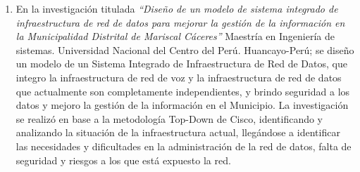 \documentclass[10pt,conference]{IEEEtran}
\begin{document}
\begin{enumerate}
\item En la investigación titulada \textit{“Diseño de un modelo de sistema integrado de infraestructura de red de datos para mejorar la gestión de la información en la Municipalidad Distrital de Mariscal Cáceres”} Maestría en Ingeniería de sistemas. Universidad Nacional del Centro del Perú. Huancayo-Perú; \citep{pacheco} se diseño un modelo de un Sistema Integrado de Infraestructura de Red de Datos, que integro la infraestructura de red de voz y la infraestructura de red de datos que actualmente son completamente independientes, y brindo seguridad a los datos y mejoro la gestión de la información en el Municipio.  La investigación se realizó en base a la metodología Top-Down de Cisco, identificando y analizando la situación de la infraestructura actual, llegándose a identificar las necesidades y dificultades en la administración de la red de datos, falta de seguridad y riesgos a los que está expuesto la red. 
\end{enumerate}
\end{document}
